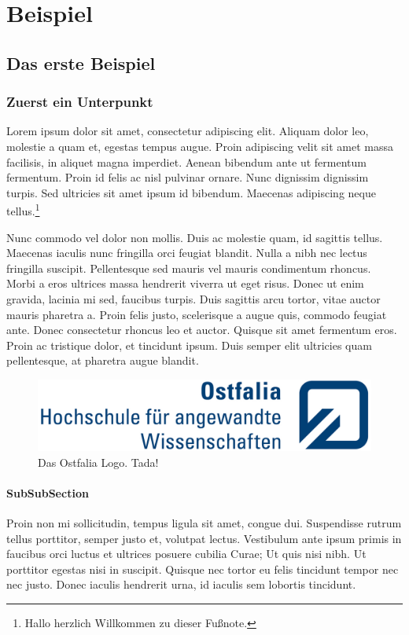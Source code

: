 \chapter{Beispiel}

\section{Das erste Beispiel}

\subsection{Zuerst ein Unterpunkt}
Lorem ipsum dolor sit amet, consectetur adipiscing elit. Aliquam dolor leo, molestie a quam et, egestas tempus augue. Proin adipiscing velit sit amet massa facilisis, in aliquet magna imperdiet. Aenean bibendum ante ut fermentum fermentum. Proin id felis ac nisl pulvinar ornare. Nunc dignissim dignissim turpis. Sed ultricies sit amet ipsum id bibendum. Maecenas adipiscing neque tellus.\footnote{Hallo herzlich Willkommen zu dieser Fußnote.}

Nunc commodo vel dolor non mollis. Duis ac molestie quam, id sagittis tellus. Maecenas iaculis nunc fringilla orci feugiat blandit. Nulla a nibh nec lectus fringilla suscipit. Pellentesque sed mauris vel mauris condimentum rhoncus. Morbi a eros ultrices massa hendrerit viverra ut eget risus. Donec ut enim gravida, lacinia mi sed, faucibus turpis. Duis sagittis arcu tortor, vitae auctor mauris pharetra a. Proin felis justo, scelerisque a augue quis, commodo feugiat ante. Donec consectetur rhoncus leo et auctor. Quisque sit amet fermentum eros. Proin ac tristique dolor, et tincidunt ipsum. Duis semper elit ultricies quam pellentesque, at pharetra augue blandit.

\begin{figure}
	\begin{center}
		\includegraphics{bilder/ostfalia_logo.jpg}
		\caption{Das Ostfalia Logo. Tada!}
	\end{center}
\end{figure}

\subsubsection{SubSubSection}
Proin non mi sollicitudin, tempus ligula sit amet, congue dui. Suspendisse rutrum tellus porttitor, semper justo et, volutpat lectus. Vestibulum ante ipsum primis in faucibus orci luctus et ultrices posuere cubilia Curae; Ut quis nisi nibh. Ut porttitor egestas nisi in suscipit. Quisque nec tortor eu felis tincidunt tempor nec nec justo. Donec iaculis hendrerit urna, id iaculis sem lobortis tincidunt.

